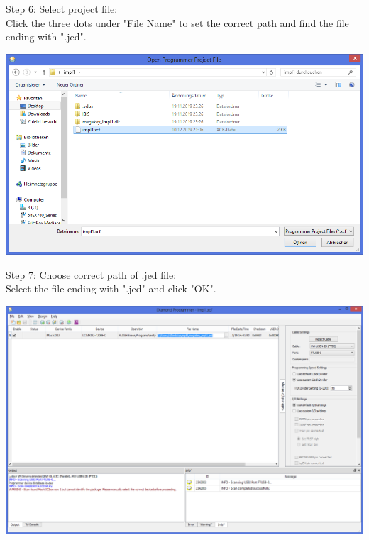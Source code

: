 \begin{minipage}{\linewidth}
Step 6: Select project file: \\
Click the three dots under "File Name" to set the correct
path and find the file ending with ".jed".
  \begin{center}
  \includegraphics[width=0.8\linewidth]{images/diamond06.png}
  \end{center}
\end{minipage}


\begin{minipage}{\linewidth}
Step 7: Choose correct path of .jed file: \\
Select the file ending with ".jed" and click "OK".
  \begin{center}
  \includegraphics[width=0.8\linewidth]{images/diamond07.png}
  \end{center}
\end{minipage}

\vspace{5mm}

